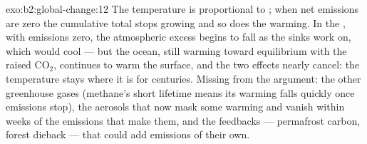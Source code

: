 \begin{solution}{exo:b2:global-change:12}
The temperature is proportional to ; when
net emissions are zero the cumulative total stops growing and so
does the warming. In the , with emissions zero, the
atmospheric excess begins to fall as the sinks work on, which
would cool --- but the ocean, still warming toward equilibrium
with the raised \ensuremath{\mathrm{CO_2}}, continues to warm the
surface, and the two effects nearly cancel: the temperature stays
where it is for centuries. Missing from the argument: the other
greenhouse gases (methane's short lifetime means its warming
falls quickly once emissions stop), the aerosols that now mask
some warming and vanish within weeks of the emissions that make
them, and the feedbacks --- permafrost carbon, forest dieback ---
that could add emissions of their own.
\end{solution}

